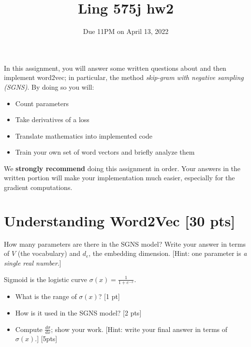 \documentclass[11pt]{article}
\begin{document}
\title{Ling 575j hw2}
\date{\vspace{-0.2in}Due 11PM on April 13, 2022}
\maketitle


In this assignment, you will answer some written questions about and then implement word2vec; in particular, the method \emph{skip-gram with negative sampling (SGNS)}.  By doing so you will:
\begin{itemize}
  \item Count parameters
  \item Take derivatives of a loss
  \item Translate mathematics into implemented code
  \item Train your own set of word vectors and briefly analyze them
\end{itemize}
We \textbf{strongly recommend} doing this assignment in order.  Your answers in the written portion will make your implementation much easier, especially for the gradient computations.


\section{Understanding Word2Vec [30 pts]}

  How many parameters are there in the SGNS model?  Write your answer in terms of $V$ (the vocabulary) and $d_e$, the embedding dimension.  [Hint: one parameter is \emph{a single real number}.]


\vspace{2em}
  Sigmoid is the logistic curve $\sigma(x) = \frac{1}{1+e^{-x}}$.
\begin{itemize}
  \item What is the range of $\sigma(x)$? [1 pt]
  \item How is it used in the SGNS model? [2 pts]
  \item Compute $\frac{d\sigma}{dx}$; show your work.  [Hint: write your final answer in terms of $\sigma(x)$.] [5pts]
\end{itemize}
\end{document}
